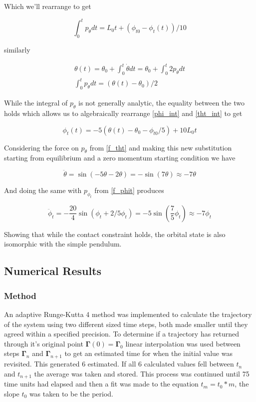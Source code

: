 \documentclass[prb,preprint]{revtex4-1}
\begin{document}
Which we'll rearrange to get

\begin{equation}\label{phi_int}
	\int_0^t  p_{ \theta } dt
	= L_0t + (\phi_{t0}  - \phi_t(t))/10
\end{equation}

similarly

\begin{equation}\label{tht_int}
  \begin{multlined}
	\theta(t) 
	= \theta_{ 0} + \int_0^t  \dot \theta  dt
	= \theta_{ 0} + \int_0^t  2 p_{\theta} dt
	\\
	\int_0^t  p_{\theta} dt = (\theta(t)-\theta_{0})/2
  \end{multlined}
\end{equation}

While the integral of $p_\theta$ is not generally analytic, the equality between the two holds which allows us to algebraically rearrange \ref{phi_int} and \ref{tht_int} to get

\begin{equation}
	\phi_t(t)=  -5(\theta(t)-\theta_{0}-\phi_{t0}/5) + 10L_0 t 
\end{equation}

Considering the force on $p_\theta$ from \ref{f_tht} and making this new substitution starting from equilibrium and a zero momentum starting condition we have

\begin{equation}
	\ddot \theta = \sin(-5\theta -2\theta) = -\sin(7\theta)\approx -7\theta
\end{equation}

And doing the same with $p_{\phi_t}$ from \ref{f_phit} produces

\begin{equation}
	\ddot \phi_t = -\frac{20}{4}\sin(\phi_t +2/5\phi_t) =  -5\sin(\frac{7}{5}\phi_t)\approx -7\phi_t
\end{equation}

Showing that while the contact constraint holds, the orbital state is also isomorphic with the simple pendulum.

\subsection{Numerical Results}
\subsubsection{Method}
An adaptive Runge-Kutta 4 method was implemented to calculate the trajectory of the system using two different sized time steps, both made smaller until they agreed within a specified precision. To determine if a trajectory has returned through it's original point $\boldsymbol{\Gamma}(0)=\boldsymbol{\Gamma}_0$ linear interpolation was used between steps $\boldsymbol{\Gamma}_n$ and $\boldsymbol{\Gamma}_{n+1}$ to get an estimated time for when the initial value was revisited. This generated 6 estimated. If all 6 calculated values fell between $t_n$ and $t_{n+1}$ the average was taken and stored. This process was continued until 75 time units had elapsed and then a fit was made to the equation $t_m = t_0*m$, the slope $t_0$ was taken to be the period.
\end{document}
